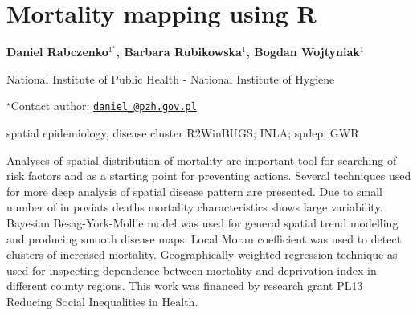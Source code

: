 \documentclass[\main/boa.tex]{subfiles}
\begin{document}
\section{Mortality mapping using R}

\begin{center}
  {\bf {} Daniel Rabczenko$^{1^\star}$,  Barbara Rubikowska$^{1}$,  Bogdan Wojtyniak$^{1}$}
\end{center}

\vskip 0.3cm

\begin{affiliations}
\begin{enumerate}
\begin{minipage}{0.915\textwidth}
\centering
\item National Institute of Public Health - National Institute of Hygiene \\[-2pt]
\end{minipage}
\end{enumerate}
$^\star$Contact author: \href{mailto:daniel@pzh.gov.pl}{\nolinkurl{daniel\_@pzh.gov.pl}}\\
\end{affiliations}

\vskip 0.5cm

\begin{minipage}{0.915\textwidth}
\keywords spatial epidemiology, disease cluster
\packages {} R2WinBUGS;  INLA;  spdep;  GWR
\end{minipage}

\vskip 0.8cm

Analyses of spatial distribution of mortality are important tool for searching of risk factors and as a starting point for preventing actions. Several techniques used for more deep analysis of spatial disease pattern are presented. Due to small number of in poviats deaths mortality characteristics shows large variability. Bayesian Besag-York-Mollie model was used for general spatial trend modelling and producing smooth disease maps. Local Moran coefficient was used to detect clusters of increased mortality. Geographically weighted regression technique as used for inspecting dependence between mortality and deprivation index in different county regions. This work was financed by research grant PL13 Reducing Social Inequalities in Health.
\end{document}
